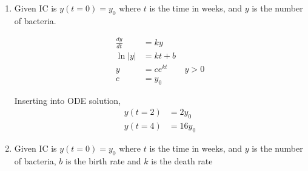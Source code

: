 \begin{enumerate}
    \item Given IC is $y(t = 0) = y_{0}$ where $ t $ is the time in weeks, and $ y $ is the number of bacteria.

          \begin{align}
              \frac{dy}{dt}  & = ky                  \\
              \ln        |y| & = kt + b              \\
              y              & = c e^{kt} \qquad y>0 \\
              c              & = y_{0}
          \end{align}
          \begin{figure}[H]
              \centering
          \end{figure}
          Inserting into ODE solution,
          \begin{align}
              y(t = 2) & = 2y_{0}   \\
              y(t = 4) & = 16 y_{0}
          \end{align}


    \item Given IC is $y(t = 0) = y_{0}$ where $ t $ is the time in weeks, and $ y $ is the number of bacteria, $ b $ is the birth rate and $ k $ is the death rate


\end{enumerate}
